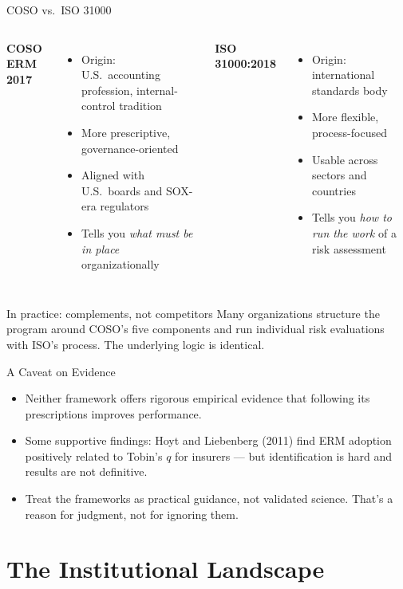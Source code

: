 \documentclass[11pt, aspectratio=169]{beamer}
\begin{document}
\begin{frame}{COSO vs.\ ISO 31000}
\begin{columns}[T]
\textbf{COSO ERM 2017}
\begin{itemize}
  \item Origin: U.S.\ accounting profession, internal-control tradition
  \item More prescriptive, governance-oriented
  \item Aligned with U.S.\ boards and SOX-era regulators
  \item Tells you \emph{what must be in place} organizationally
\end{itemize}
\textbf{ISO 31000:2018}
\begin{itemize}
  \item Origin: international standards body
  \item More flexible, process-focused
  \item Usable across sectors and countries
  \item Tells you \emph{how to run the work} of a risk assessment
\end{itemize}
\end{columns}
\medskip
\begin{block}{In practice: complements, not competitors}
Many organizations structure the program around COSO's five components and run individual risk evaluations with ISO's process. The underlying logic is identical.
\end{block}
\end{frame}

\begin{frame}{A Caveat on Evidence}
\begin{itemize}
  \item Neither framework offers rigorous empirical evidence that following its prescriptions improves performance.
  \item Some supportive findings: Hoyt and Liebenberg (2011) find ERM adoption positively related to Tobin's $q$ for insurers --- but identification is hard and results are not definitive.
  \item Treat the frameworks as \alert{practical guidance}, not validated science. That's a reason for judgment, not for ignoring them.
\end{itemize}
\end{frame}

\section{The Institutional Landscape}
\end{document}

